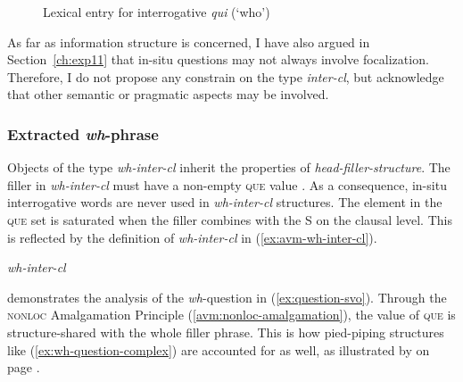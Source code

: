 \begin{figure}[h]
\caption{Lexical entry for interrogative \emph{qui} (`who')}\label{ex:avm-qui}
\end{figure}


As far as information structure is concerned, I have also argued in Section~\ref{ch:exp11} that in-situ questions may not always involve focalization. Therefore, I do not propose any constrain on the type \emph{inter-cl}, but acknowledge that other semantic or pragmatic aspects may be involved.

\subsubsection{Extracted \emph{wh}-phrase}

Objects of the type \emph{wh-inter-cl} inherit the properties of \emph{head-filler-structure}. The filler in \emph{wh-inter-cl} must have a non-empty \textsc{que} value \citep[see the Filler Inclusion Constraint in][228]{Ginzburg.2000}. As a consequence, in-situ interrogative words are never used in \emph{wh-inter-cl} structures. The element in the \textsc{que} set is saturated when the filler combines with the S on the clausal level. This is reflected by the definition of \emph{wh-inter-cl} in (\ref{ex:avm-wh-inter-cl}). 

\ea \textit{wh-inter-cl} \avm{$\Rightarrow$}\nopagebreak

\label{ex:avm-wh-inter-cl}
\z 

 demonstrates the analysis of the \emph{wh}-question in (\ref{ex:question-svo}). Through the \textsc{nonloc} Amalgamation Principle (\ref{avm:nonloc-amalgamation}), the value of \textsc{que} is struc\-ture-shared with the whole filler phrase. This is how pied-piping structures like (\ref{ex:wh-question-complex}) are accounted for as well, as illustrated by  on page \pageref{fig:wh-question-complex}.


